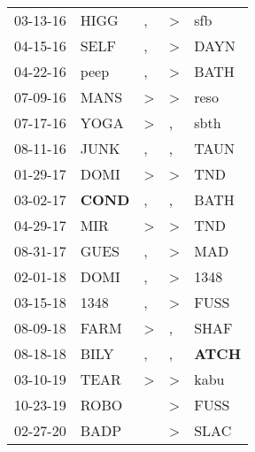 \begin{supertabular}{p{0.07\textwidth}p{0.06\textwidth}p{0.02\textwidth}p{0.02\textwidth}p{0.06\textwidth}}
 03-13-16\textsuperscript{} &           HIGG\textsuperscript{} &             , &  \textgreater &            sfb\textsuperscript{} \\
 04-15-16\textsuperscript{} &           SELF\textsuperscript{} &             , &  \textgreater &           DAYN\textsuperscript{} \\
 04-22-16\textsuperscript{} &           peep\textsuperscript{} &             , &  \textgreater &           BATH\textsuperscript{} \\
 07-09-16\textsuperscript{} &           MANS\textsuperscript{} &  \textgreater &  \textgreater &           reso\textsuperscript{} \\
 07-17-16\textsuperscript{} &           YOGA\textsuperscript{} &  \textgreater &             , &           sbth\textsuperscript{} \\
 08-11-16\textsuperscript{} &           JUNK\textsuperscript{} &             , &             , &           TAUN\textsuperscript{} \\
 01-29-17\textsuperscript{} &           DOMI\textsuperscript{} &  \textgreater &  \textgreater &            TND\textsuperscript{} \\
 03-02-17\textsuperscript{} &  \textbf{COND\textsuperscript{}} &             , &             , &           BATH\textsuperscript{} \\
 04-29-17\textsuperscript{} &            MIR\textsuperscript{} &  \textgreater &  \textgreater &            TND\textsuperscript{} \\
 08-31-17\textsuperscript{} &           GUES\textsuperscript{} &             , &  \textgreater &            MAD\textsuperscript{} \\
 02-01-18\textsuperscript{} &           DOMI\textsuperscript{} &             , &  \textgreater &           1348\textsuperscript{} \\
 03-15-18\textsuperscript{} &           1348\textsuperscript{} &             , &  \textgreater &           FUSS\textsuperscript{} \\
 08-09-18\textsuperscript{} &           FARM\textsuperscript{} &  \textgreater &             , &           SHAF\textsuperscript{} \\
 08-18-18\textsuperscript{} &           BILY\textsuperscript{} &             , &             , &  \textbf{ATCH\textsuperscript{}} \\
 03-10-19\textsuperscript{} &           TEAR\textsuperscript{} &  \textgreater &  \textgreater &           kabu\textsuperscript{} \\
 10-23-19\textsuperscript{} &           ROBO\textsuperscript{} &               &  \textgreater &           FUSS\textsuperscript{} \\
 02-27-20\textsuperscript{} &           BADP\textsuperscript{} &               &  \textgreater &           SLAC\textsuperscript{} \\
\end{supertabular}

